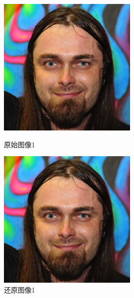 \begin{figure}[H]
\begin{minipage}[b]{0.3\linewidth}
    \includegraphics[width=\linewidth]{Picture/label/00000.png}
    \caption{原始图像1}
    \label{original image 1 }
  \end{minipage}
\hspace{0.1cm}
  \begin{minipage}[b]{0.3\linewidth}
    \includegraphics[width=\linewidth]{Picture/recon/00000.png}
    \caption{还原图像1}
    \label{inpainted image 1}
  \end{minipage}
\end{figure}

